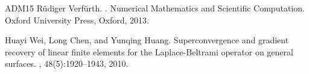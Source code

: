 \documentclass{amsart}
\begin{document}
\begin{thebibliography}{ADM{\etalchar{+}}15}
R\"{u}diger Verf\"{u}rth.
.
\newblock Numerical Mathematics and Scientific Computation. Oxford University
  Press, Oxford, 2013.

Huayi Wei, Long Chen, and Yunqing Huang.
\newblock Superconvergence and gradient recovery of linear finite elements for
  the {L}aplace-{B}eltrami operator on general surfaces.
, 48(5):1920--1943, 2010.

\end{thebibliography}
\end{document}
